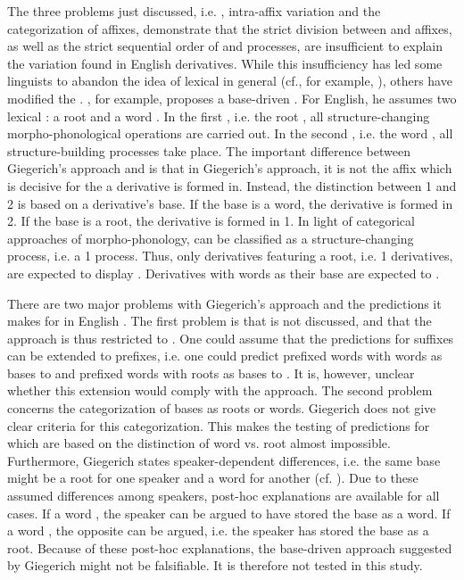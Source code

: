 The three problems just discussed, i.e. , intra-affix variation and the categorization of affixes, demonstrate that the strict division between  and  affixes, as well as the strict sequential order of  and  processes, are insufficient to explain the variation found in English derivatives. While this insufficiency has led some linguists to  abandon the idea of lexical  in general (cf., for example, \citealt{Johnson.1997b,Bybee.2001,Pierrehumbert.2001,Hay.2001}), others have modified the . 
\cite{Giegerich.1999}, for example, proposes a base-driven . For English, he assumes two lexical : a root  and a word . In the first , i.e. the root , all structure-changing morpho-phonological operations are carried out. In the second , i.e. the word , all structure-building processes take place. The important difference between Giegerich's approach and  is that in Giegerich's approach, it is not the affix which is decisive for the  a derivative is formed in. Instead, the distinction between  1 and  2 is based on a derivative's base. If the base is a word, the derivative is formed in  2. If the base is a root, the derivative is formed in  1. In light of categorical approaches of morpho-phonology,  can be classified as a structure-changing process, i.e. a  1 process. Thus, only derivatives featuring a root, i.e.  1 derivatives, are expected to display . Derivatives with words as their base are expected to .

There are two major problems with Giegerich's approach  and the predictions it makes for  in English . The first problem is that  is not discussed, and that the approach is thus restricted to . One could assume that the predictions for suffixes can be extended to prefixes, i.e. one could predict prefixed words with words as bases to  and prefixed words with roots as bases to . It is, however, unclear whether this extension would comply with the approach. 
The second problem concerns the categorization of bases as roots or words. Giegerich does not give clear criteria for this categorization. This makes the testing of predictions for  which are based on the distinction of word vs. root almost impossible. 
Furthermore, Giegerich states speaker-dependent differences, i.e. the same base might be a root for one speaker and a word for another (cf. \citealt[chapter 3.2.1.]{Giegerich.1999}). 
Due to these assumed differences among speakers, post-hoc explanations are available for all cases. If a word , the speaker can be argued to have stored the base as a word. If a word , the opposite can be argued, i.e. the speaker has stored the base as a root. Because of these post-hoc explanations, the base-driven approach suggested by Giegerich might not be falsifiable. It is therefore not tested in this study.

